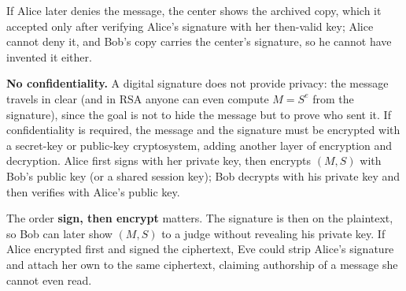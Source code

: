 If Alice later denies the message, the center shows the archived copy, which it accepted only after verifying Alice's signature with her then-valid key; Alice cannot deny it, and Bob's copy carries the center's signature, so he cannot have invented it either. 

\textbf{No confidentiality.} A digital signature does not provide privacy: the message travels in clear (and in RSA anyone can even compute $M = S^e$ from the signature), since the goal is not to hide the message but to prove who sent it. If confidentiality is required, the message and the signature must be encrypted with a secret-key or public-key cryptosystem, adding another layer of encryption and decryption. Alice first signs with her private key, then encrypts $(M, S)$ with Bob's public key (or a shared session key); Bob decrypts with his private key and then verifies with Alice's public key.
\begin{center}
\end{center}
The order \textbf{sign, then encrypt} matters. The signature is then on the plaintext, so Bob can later show $(M, S)$ to a judge without revealing his private key. If Alice encrypted first and signed the ciphertext, Eve could strip Alice's signature and attach her own to the same ciphertext, claiming authorship of a message she cannot even read.

